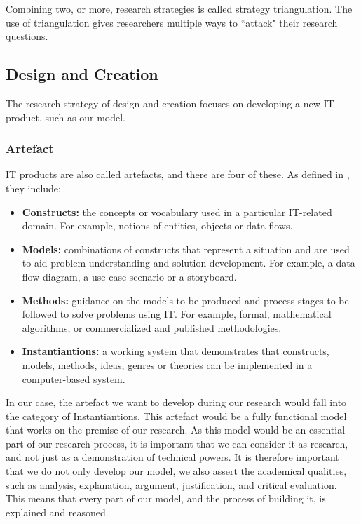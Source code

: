 Combining two, or more, research strategies is called strategy triangulation. The use of triangulation gives researchers multiple ways to ``attack" their research questions. 

\subsection{Design and Creation}
The research strategy of design and creation focuses on developing a new IT product, such as our model.

\subsubsection{Artefact}
IT products are also called artefacts, and there are four of these. As defined in \cite{article-march1995}, they include:

\begin{itemize}
    \item \textbf{Constructs:} the concepts or vocabulary used in a particular IT-related domain. For example, notions of entities, objects or data flows.
    \item \textbf{Models:} combinations of constructs that represent a situation and are used to aid problem understanding and solution development. For example, a data flow diagram, a use case scenario or a storyboard.
    \item \textbf{Methods:} guidance on the models to be produced and process stages to be followed to solve problems using IT. For example, formal, mathematical algorithms, or commercialized and published methodologies.
    \item \textbf{Instantiantions:} a working system that demonstrates that constructs, models, methods, ideas, genres or theories can be implemented in a computer-based system.
\end{itemize}

In our case, the artefact we want to develop during our research would fall into the category of Instantiantions. This artefact would be a fully functional model that works on the premise of our research. As this model would be an essential part of our research process, it is important that we can consider it as research, and not just as a demonstration of technical powers. It is therefore important that we do not only develop our model, we also assert the academical qualities, such as analysis, explanation, argument, justification, and critical evaluation. This means that every part of our model, and the process of building it, is explained and reasoned.

